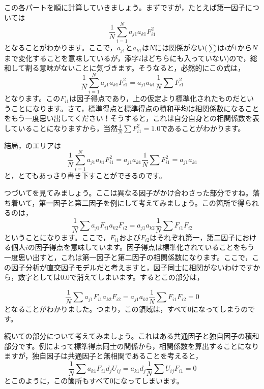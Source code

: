 \documentclass{ltjsbook}
\begin{document}
この各パートを順に計算していきましょう。まずですが，たとえば第一因子については
\begin{equation}
	\frac{1}{N}\sum_{i=1}^{N}a_{j1}a_{k1}F_{i1}^2
\end{equation}
となることがわかります。ここで，$a_{j1}$と$a_{k1}$は$N$には関係がない($\sum$は$i$が$1$から$N$まで変化することを意味しているが，添字$i$はどちらにも入っていない)ので，総和して割る意味がないことに気づきます。そうなると，必然的にこの式は，
\begin{equation}
	\frac{1}{N}\sum_{i=1}^{N}a_{j1}a_{k1}F_{i1}^2=a_{j1}a_{k1}\frac{1}{N}\sum F_{i1}^2
\end{equation}
となります。この$F_{i1}$は因子得点であり，上の仮定より標準化されたものだということになります。さて，標準得点と標準得点の積和平均は相関係数になることをもう一度思い出してください！そうすると，これは自分自身との相関係数を表していることになりますから，当然$\frac{1}{N}\sum F_{i1}^2=1.0$であることがわかります。

結局，のエリアは
\begin{equation}
	\frac{1}{N}\sum_{i=1}^{N}a_{j1}a_{k1}F_{i1}^2=a_{j1}a_{k1}\frac{1}{N}\sum F_{i1}^2=a_{j1}a_{k1}
\end{equation}
と，とてもあっさり書き下すことができるのです。

つづいてを見てみましょう。ここは異なる因子がかけ合わさった部分ですね。落ち着いて，第一因子と第二因子を例にして考えてみましょう。この箇所で得られるのは，
\begin{equation}
	\frac{1}{N}\sum a_{j1}F_{i1} a_{k2}F_{i2} = a_{j1}a_{k2}\frac{1}{N}\sum F_{i1}F_{i2}
\end{equation}
ということになります。ここで，$F_{i1}$および$F_{i2}$はそれぞれ第一，第二因子における個人$i$の因子得点を意味しています。因子得点は標準化されていることをもう一度思い出すと，これは第一因子と第二因子の相関係数になります。ここで，この因子分析が直交因子モデルだと考えますと，因子同士に相関がないわけですから，数字としては$0.0$で消えてしまいます。するとこの部分は，

\begin{equation}
	\frac{1}{N}\sum a_{j1}F_{i1} a_{k2}F_{i2} = a_{j1}a_{k2}\frac{1}{N}\sum F_{i1}F_{i2}=0
\end{equation}
となることがわかりました。つまり，この領域は，すべて$0$になってしまうのです。


続いての部分について考えてみましょう。これはある共通因子と独自因子の積和部分です。例によって標準得点同士の関係から，相関係数を算出することになりますが，独自因子は共通因子と無相関であることを考えると，
\begin{equation}
	\frac{1}{N}\sum a_{k1}F_{i1}d_{j}U_{ij}=a_{k1}d_{j} \frac{1}{N}\sum U_{ij}F_{i1} =0
\end{equation}
とこのように，この箇所もすべて$0$になってしまいます。
\end{document}
